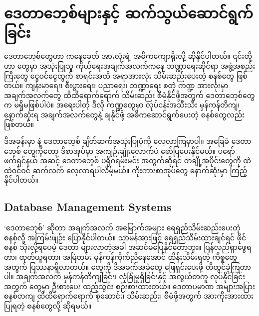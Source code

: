 \chapter{ဒေတာဘေ့စ်များနှင့် ဆက်သွယ်ဆောင်ရွက်ခြင်း}

ဒေတာဘေ့စ်တွေဟာ ကနေ့ခေတ်  အားလုံးရဲ့ အဓိကကျောရိုးလို့ ဆိုနိုင်ပါတယ်။ ၎င်းတို့ဟာ  တွေမှာ အသုံးပြုသူ ကိုယ်ရေးအချက်အလက်ကနေ ဘဏ္ဍာရေးဆိုင်ရာ အဖွဲ့အစည်းကြီးတွေ ငွေဝင်ငွေထွက် စာရင်းအထိ အရာအားလုံး သိမ်းဆည်းပေးတဲ့ စနစ်တွေ ဖြစ်တယ်။ ကျန်းမာရေး၊ စီးပွားရေး၊ ပညာရေး၊ ဘဏ္ဍာရေး စတဲ့ ကဏ္ဍ အားလုံးမှာ အချက်အလက်တွေ ထိထိရောက်ရောက် သိမ်းဆည်း စီမံနိုင်ဖို့အတွက် ဒေတာဘေ့စ်တွေက မရှိမဖြစ်ပါပဲ။ အရေးပါတဲ့ ဒီလို ကဏ္ဍတွေမှာ လုပ်\allowbreak ငန်းအသီးသီး မှန်ကန်တိကျ၊ နောက်ဆုံးရ အချက်အလက်တွေနဲ့   ချနိုင်ဖို့ အဓိကဆောင်ရွက်ပေးတဲ့ စနစ်တွေလည်း ဖြစ်တယ်။

ဒီအခန်းမှာ  နဲ့ ဒေတာဘေ့စ် ချိတ်ဆက်အသုံးပြုပုံကို လေ့လာကြမှာပါ။ အခြေ\allowbreak ခံ ဒေတာဘေ့စ်  တွေကိုတော့ ဒီစာအုပ်မှာ အကျဉ်းချုံးလောက်ပဲ ဖော်ပြပေးနိုင်မယ်။ ပရော်ဖက်ရှင်နယ် အဆင့် ဒေတာဘေ့စ် ပရိုဂရမ်းမင်း အတွက်ဆိုရင် တချို့အပိုင်းတွေကို ထဲထဲဝင်ဝင် ဆက်လက် လေ့လာရပါလိမ့်မယ်။ ကိုးကားစာအုပ်တွေ နောက်ဆုံးမှာ ကြည့်နိုင်ပါတယ်။


\section{Database Management Systems}
‘ဒေတာဘေ့စ်’ ဆိုတာ အချက်အလက် အမြောက်အများ ရေရှည်သိမ်းဆည်းပေးတဲ့ စနစ်လို့ အကြမ်းဖျဉ်း ပြောနိုင်ပါတယ်။ သာမန်အားဖြင့် ရေရှည်သိမ်းထားချင်ရင် ဖိုင်စနစ် သုံးလို့ရပေမဲ့ ဒေတာ များလာတဲ့အခါ အဆင်မပြေနိုင်တော့ဘူး။ ပြန်လည်ရှာဖွေရတာ၊ ထုတ်ယူရတာ၊ အမြဲတမ်း မှန်ကန်ကိုက်ညီနေအောင် ထိန်းသိမ်းရတဲ့ ကိစ္စတွေအတွက် ပြဿနာရှိလာတယ်။  တွေကို ဒီအခက်အခဲတွေ ဖြေရှင်းပေးဖို့  တီထွင်ခဲ့ကြတာပါ။ အချက်အလက် မှန်ကန်တိကျခြင်း၊ လုံခြုံမှုရှိခြင်းနှင့် အလွယ်တကူ  လုပ်နိုင်ခြင်းအတွက်  တွေမှာ ဦးစားပေး ထည့်သွင်း စဉ်းစားထားတယ်။ ဒေတာပမာဏ အများအပြား စနစ်တကျ ထိထိရောက်ရောက် စုဆောင်း၊ သိမ်းဆည်း၊ စီမံဖို့အတွက် အားကိုးအားထားပြုရတဲ့ စနစ်တွေလို့ ဆိုရမယ်။  


